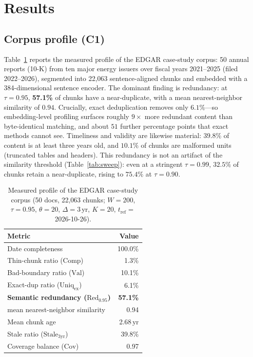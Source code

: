 \documentclass[conference]{IEEEtran}
\begin{document}
\section{Results}\label{sec:results}

\subsection{Corpus profile (C1)}
Table~\ref{tab:profile} reports the measured profile of the EDGAR case-study corpus:
50 annual reports (10-K) from ten major energy issuers over fiscal years 2021--2025
(filed 2022--2026), segmented into 22{,}063 sentence-aligned chunks and embedded with a
384-dimensional sentence encoder. The dominant finding is redundancy: at $\tau=0.95$,
\textbf{57.1\%} of chunks have a near-duplicate, with a mean nearest-neighbor similarity of
$0.94$. Crucially, exact deduplication removes only $6.1\%$---so embedding-level profiling
surfaces roughly $9\times$ more redundant content than byte-identical matching, and about
$51$ further percentage points that exact methods cannot see. Timeliness and validity are
likewise material: $39.8\%$ of content is at least three years old, and $10.1\%$ of chunks
are malformed units (truncated tables and headers). This redundancy is not an artifact of the
similarity threshold (Table~\ref{tab:sweep}): even at a stringent $\tau=0.99$, $32.5\%$ of
chunks retain a near-duplicate, rising to $75.4\%$ at $\tau=0.90$.

\begin{table}[t]
\caption{Measured profile of the EDGAR case-study corpus (50 docs, 22{,}063 chunks;
$W{=}200$, $\tau{=}0.95$, $\theta{=}20$, $\Delta{=}3$\,yr, $K{=}20$, $t_{\mathrm{ref}}{=}$ 2026-10-26).}
\label{tab:profile}
\centering
\begin{tabular}{@{}lr@{}}
\toprule
Metric & Value \\
\midrule
Date completeness & 100.0\% \\
Thin-chunk ratio ($\mathrm{Comp}$) & 1.3\% \\
Bad-boundary ratio ($\mathrm{Val}$) & 10.1\% \\
Exact-dup ratio ($\mathrm{Uniq}_{\mathrm{ex}}$) & 6.1\% \\
\textbf{Semantic redundancy ($\mathrm{Red}_{0.95}$)} & \textbf{57.1\%} \\
\quad mean nearest-neighbor similarity & 0.94 \\
Mean chunk age & 2.68\,yr \\
Stale ratio ($\mathrm{Stale}_{3\mathrm{yr}}$) & 39.8\% \\
Coverage balance ($\mathrm{Cov}$) & 0.97 \\
\bottomrule
\end{tabular}
\end{table}
\end{document}

